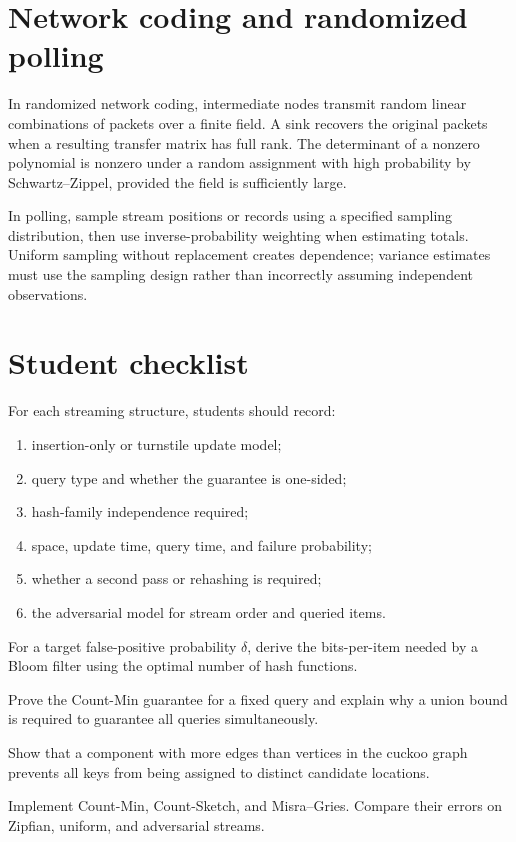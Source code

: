 \section{Network coding and randomized polling}

In randomized network coding, intermediate nodes transmit random linear
combinations of packets over a finite field.  A sink recovers the original
packets when a resulting transfer matrix has full rank.  The determinant of a
nonzero polynomial is nonzero under a random assignment with high probability
by Schwartz--Zippel, provided the field is sufficiently large.

In polling, sample stream positions or records using a specified sampling
distribution, then use inverse-probability weighting when estimating totals.
Uniform sampling without replacement creates dependence; variance estimates
must use the sampling design rather than incorrectly assuming independent
observations.

\section{Student checklist}

For each streaming structure, students should record:

\begin{enumerate}
\item insertion-only or turnstile update model;
\item query type and whether the guarantee is one-sided;
\item hash-family independence required;
\item space, update time, query time, and failure probability;
\item whether a second pass or rehashing is required;
\item the adversarial model for stream order and queried items.
\end{enumerate}

\begin{problem}
For a target false-positive probability $\delta$, derive the bits-per-item
needed by a Bloom filter using the optimal number of hash functions.
\end{problem}

\begin{problem}
Prove the Count-Min guarantee for a fixed query and explain why a union bound
is required to guarantee all queries simultaneously.
\end{problem}

\begin{problem}
Show that a component with more edges than vertices in the cuckoo graph
prevents all keys from being assigned to distinct candidate locations.
\end{problem}

\begin{problem}
Implement Count-Min, Count-Sketch, and Misra--Gries.  Compare their errors on
Zipfian, uniform, and adversarial streams.
\end{problem}
